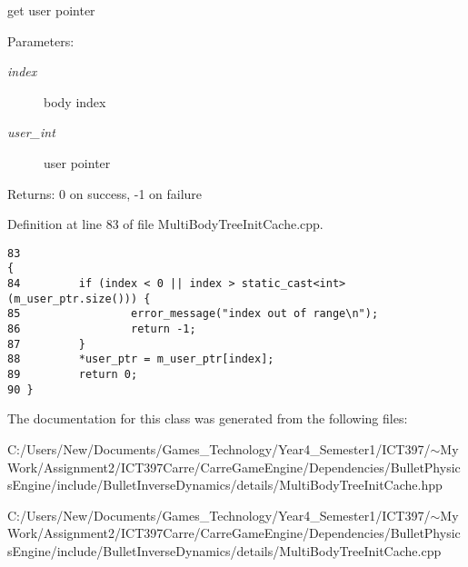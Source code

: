 get user pointer \begin{Desc}
\item[Parameters:]
\begin{description}
\item[{\em index}]body index \item[{\em user\_\-int}]user pointer \end{description}
\end{Desc}
\begin{Desc}
\item[Returns:]0 on success, -1 on failure \end{Desc}


Definition at line 83 of file MultiBodyTreeInitCache.cpp.

\begin{Code}\begin{verbatim}83                                                                              {
84         if (index < 0 || index > static_cast<int>(m_user_ptr.size())) {
85                 error_message("index out of range\n");
86                 return -1;
87         }
88         *user_ptr = m_user_ptr[index];
89         return 0;
90 }
\end{verbatim}
\end{Code}




The documentation for this class was generated from the following files:\begin{CompactItemize}
\item 
C:/Users/New/Documents/Games\_\-Technology/Year4\_\-Semester1/ICT397/$\sim$My Work/Assignment2/ICT397Carre/CarreGameEngine/Dependencies/BulletPhysicsEngine/include/BulletInverseDynamics/details/MultiBodyTreeInitCache.hpp\item 
C:/Users/New/Documents/Games\_\-Technology/Year4\_\-Semester1/ICT397/$\sim$My Work/Assignment2/ICT397Carre/CarreGameEngine/Dependencies/BulletPhysicsEngine/include/BulletInverseDynamics/details/MultiBodyTreeInitCache.cpp\end{CompactItemize}
